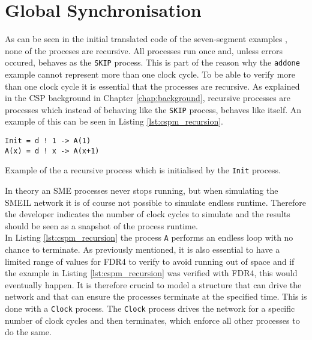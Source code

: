 \section{Global Synchronisation}
As can be seen in the initial translated \cspm{} code of the seven-segment examples %
, none of the proceses are recursive. All processes run once and, unless errors occured, behaves as the \texttt{SKIP} process. This is part of the reason why the \texttt{addone} example cannot represent more than one clock cycle. To be able to verify more than one clock cycle it is essential that the processes are recursive. As explained in the CSP background in Chapter \ref{chap:background}, recursive processes are processes which instead of behaving like the \texttt{SKIP} process, behaves like itself. An example of this can be seen in Listing \ref{lst:cspm_recursion}.
\begin{listing}
\begin{verbatim}
Init = d ! 1 -> A(1)
A(x) = d ! x -> A(x+1)
\end{verbatim}
\caption{Example of the a recursive \cspm{} process which is initialised by the \texttt{Init} process.}
\label{lst:cspm_recursion}
\end{listing}

In theory an SME processes never stops running, but when simulating the SMEIL network it is of course not possible to simulate endless runtime. Therefore the developer indicates the number of clock cycles to simulate and the results should be seen as a snapshot of the process runtime. \\

In Listing \ref{lst:cspm_recursion} the process \texttt{A} performs an endless loop with no chance to terminate. As previously mentioned, it is also essential to have a limited range of values for FDR4 to verify to avoid running out of space and if the example in Listing \ref{lst:cspm_recursion} was verified with FDR4, this would eventually happen. It is therefore crucial to model a structure that can drive the network and that can ensure the processes terminate at the specified time. This is done with a \texttt{Clock} process. The \texttt{Clock} process drives the network for a specific number of clock cycles and then terminates, which enforce all other processes to do the same. \\
%

